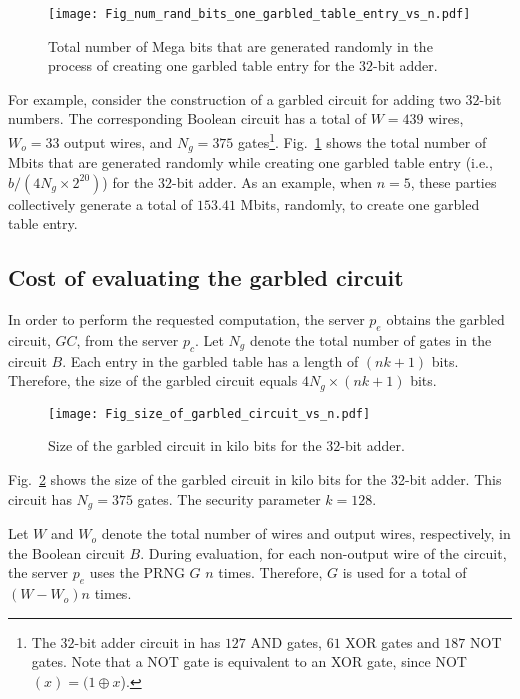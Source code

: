 \documentclass[10pt,journal,cspaper,compsoc]{IEEEtran}
\begin{document}
\begin{figure}[t]
\centering
\texttt{[image: Fig\_num\_rand\_bits\_one\_garbled\_table\_entry\_vs\_n.pdf]}
\vspace{-3 mm}
\caption{Total number of Mega bits that are generated randomly in the process of creating one garbled table entry for the $32$-bit adder.\vspace{-2 mm}}
\label{fig_num_rand_bits}
\end{figure}


For example, consider the construction of a garbled circuit for adding two $32$-bit numbers. The corresponding Boolean circuit has a total of $W=439$ wires, $W_o=33$ output wires, and $N_g=375$ gates\footnote{The $32$-bit adder circuit in \cite{boolean_circuits} has $127$ AND gates, $61$ XOR gates and $187$ NOT gates. Note that a NOT gate is equivalent to an XOR gate, since NOT$(x)=(1\oplus x$).}. Fig.~\ref{fig_num_rand_bits} shows the total number of Mbits that are generated randomly while creating one garbled table entry (i.e., $b/(4N_g\times 2^{20})$) for the $32$-bit adder. As an example, when $n=5$, these parties collectively generate a total of $153.41$ Mbits, randomly, to create one garbled table entry.


\subsection{Cost of evaluating the garbled circuit}

In order to perform the requested computation, the server $p_e$ obtains the garbled circuit, $GC$, from the server $p_c$. Let $N_g$ denote the total number of gates in the circuit $B$. Each entry in the garbled table has a length of $(nk+1)$ bits. Therefore, the size of the garbled circuit equals $4N_g\times (nk+1)$ bits.


\begin{figure}[t]
\centering
\texttt{[image: Fig\_size\_of\_garbled\_circuit\_vs\_n.pdf]}
\vspace{-3 mm}
\caption{Size of the garbled circuit in kilo bits for the $32$-bit adder.\vspace{-3 mm}}
\label{fig_size_of_garbled_circuit}
\end{figure}


Fig.~\ref{fig_size_of_garbled_circuit} shows the size of the garbled circuit in kilo bits for the 32-bit adder. This circuit has $N_g=375$ gates. The security parameter $k=128$.


Let $W$ and $W_o$ denote the total number of wires and output wires, respectively, in the Boolean circuit $B$. During evaluation, for each non-output wire of the circuit, the server $p_e$ uses the PRNG $G$ $n$ times. Therefore, $G$ is used for a total of $(W-W_o)n$ times.
\end{document}
